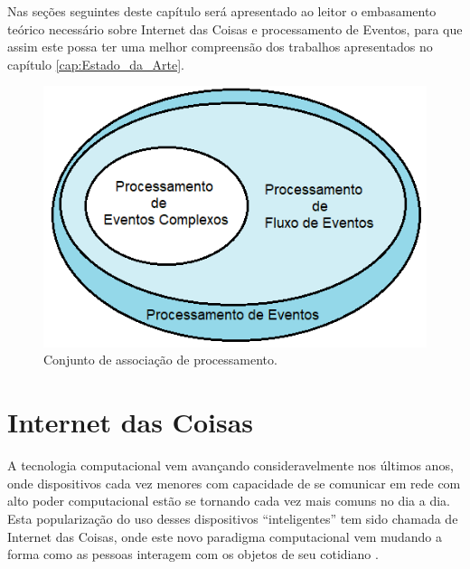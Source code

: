\documentclass[ti,table]{texufpel} %
\begin{document}
  

Nas seções seguintes deste capítulo será apresentado ao leitor o embasamento teórico necessário sobre Internet das Coisas e processamento de Eventos, para que assim este possa ter uma melhor compreensão dos trabalhos apresentados no capítulo \ref{cap:Estado_da_Arte}. 

  

  

\begin{figure}[ht] 

    \centering 

    \includegraphics[width=.6\textwidth]{imagens/ConjuntoProcessamento.png} 

    \caption{Conjunto de associação de processamento.} 

    \label{fig:ConjuntoProcessamento} 

\end{figure} 

  

  

\section{Internet das Coisas} 

  

A tecnologia computacional vem avançando consideravelmente nos últimos anos, onde dispositivos cada vez menores com capacidade de se comunicar em rede com alto poder computacional estão se tornando cada vez mais comuns no dia a dia. Esta popularização do uso desses dispositivos ``inteligentes'' tem sido chamada de Internet das Coisas, onde este novo paradigma computacional vem mudando a forma como as pessoas interagem com os objetos de seu cotidiano \cite{xavier2016smart}. 

  
\end{document}

